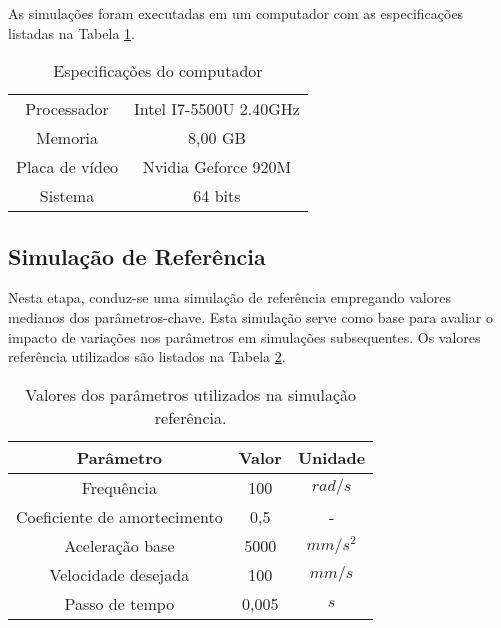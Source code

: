 As simulações foram executadas em um computador com as especificações listadas na Tabela \ref{tab:note_config}.

\begin{table}
    \begin{center}
    \caption{Especificações do computador}
    \label{tab:note_config}
    \begin{tabular}{c c}
        \hline
        Processador & Intel I7-5500U 2.40GHz \\
        Memoria & 8,00 GB \\
        Placa de vídeo & Nvidia Geforce 920M \\
        Sistema & 64 bits \\ \hline
    \end{tabular}
    \end{center}
\end{table}

\subsection{Simulação de Referência}
Nesta etapa, conduz-se uma simulação de referência empregando valores medianos dos parâmetros-chave. Esta simulação serve como base para avaliar o impacto de variações nos parâmetros em simulações subsequentes. Os valores referência utilizados são listados na Tabela \ref{tab:base_params}.

\begin{table}
    \begin{center}
    \caption{Valores dos parâmetros utilizados na simulação referência.}
    \label{tab:base_params}
    \begin{tabular}{c c c}
        Parâmetro & Valor & Unidade\\ \hline
        Frequência & 100 & $rad/s$\\
        Coeficiente de amortecimento & 0,5 & - \\
        Aceleração base & 5000 & $mm/s^2$ \\
        Velocidade desejada & 100 & $mm/s$ \\
        Passo de tempo & 0,005 & $s$ \\ \hline
    \end{tabular}
    \end{center}
\end{table}

